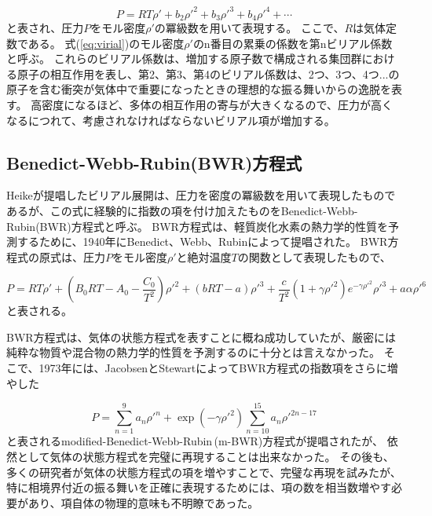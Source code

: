 \documentclass[titlepage]{jsreport}
\begin{document}
{{{\large
\begin{equation}
P=RT{\rho}'+b_2{{\rho}'}^2+b_3{{\rho}'}^3+b_4{{\rho}'}^4+\cdots \label{eq:virial}
\end{equation}
\normalsize
と表され、圧力$P$をモル密度${\rho}'$の冪級数を用いて表現する。
ここで、$R$は気体定数である。
式(\ref{eq:virial})のモル密度${\rho}'$のn番目の累乗の係数を第nビリアル係数と呼ぶ\cite{virial-expansion}。
これらのビリアル係数は、増加する原子数で構成される集団群における原子の相互作用を表し、第2、第3、第4のビリアル係数は、2つ、3つ、4つ...の原子を含む衝突が気体中で重要になったときの理想的な振る舞いからの逸脱を表す。
高密度になるほど、多体の相互作用の寄与が大きくなるので、圧力が高くなるにつれて、考慮されなければならないビリアル項が増加する\cite{virial-Heike}。

\newpage
\subsection{Benedict-Webb-Rubin(BWR)方程式}\label{method-subsec:BWR}
Heikeが提唱したビリアル展開は、圧力を密度の冪級数を用いて表現したものであるが、この式に経験的に指数の項を付け加えたものをBenedict-Webb-Rubin(BWR)方程式と呼ぶ。
BWR方程式は、軽質炭化水素の熱力学的性質を予測するために、1940年にBenedict、Webb、Rubinによって提唱された\cite{BWR-equation:original}。
BWR方程式の原式は、圧力$P$をモル密度${\rho}'$と絶対温度$T$の関数として表現したもので、

\large
\begin{equation}
P=RT{\rho}'+\left(B_0RT-A_0-{\frac{C_0}{T^2}}\right){{\rho}'}^2+(bRT-a){{\rho}'}^3+{\frac{c}{T^2}}(1+{\gamma}{{\rho}'}^2)e^{-{\gamma}{{\rho}'}^2}{{\rho}'}^3+a{\alpha}{{\rho}'}^6\label{eq:BWR}
\end{equation}
\normalsize
と表される。

BWR方程式は、気体の状態方程式を表すことに概ね成功していたが、厳密には純粋な物質や混合物の熱力学的性質を予測するのに十分とは言えなかった。
そこで、1973年には、JacobsenとStewartによってBWR方程式の指数項をさらに増やした

\large
\begin{equation}
P=\sum_{n=1}^9a_n{{\rho}'}^n+\exp(-{\gamma}{{\rho}'}^2)\sum_{n=10}^{15}a_n{{\rho}'}^{2n-17}\label{eq:m-BWR}
\end{equation}
\normalsize
と表されるmodified-Benedict-Webb-Rubin\,(m-BWR)方程式が提唱\cite{m-BWR-equation}されたが、
依然として気体の状態方程式を完璧に再現することは出来なかった。
その後も、多くの研究者が気体の状態方程式の項を増やすことで、完璧な再現を試みた\cite{MCCARTY1974276,BWR-equation:13,BWR-equation:25}が、
特に相境界付近の振る舞いを正確に表現するためには、項の数を相当数増やす必要があり、項自体の物理的意味も不明瞭であった。

}}}
\end{document}
